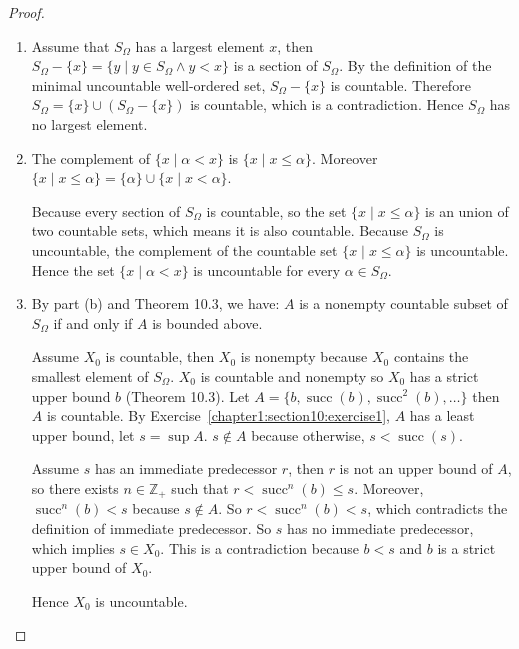 \begin{proof}
    \begin{enumerate}[label={(\alph*)}]
        \item Assume that $S_{\Omega}$ has a largest element $x$, then $S_{\Omega} - \{ x \} = \{ y \mid y\in S_{\Omega} \land y < x \}$ is a section of $S_{\Omega}$. By the definition of the minimal uncountable well-ordered set, $S_{\Omega} - \{ x \}$ is countable. Therefore $S_{\Omega} = \{ x \} \cup (S_{\Omega} - \{ x \})$ is countable, which is a contradiction. Hence $S_{\Omega}$ has no largest element.
        \item The complement of $\{ x \mid \alpha < x \}$ is $\{ x \mid x\leq \alpha \}$. Moreover $\{ x \mid x\leq \alpha \} = \{ \alpha \} \cup \{ x \mid x < \alpha \}$.

              Because every section of $S_{\Omega}$ is countable, so the set $\{ x \mid x\leq \alpha \}$ is an union of two countable sets, which means it is also countable. Because $S_{\Omega}$ is uncountable, the complement of the countable set $\{ x \mid x\leq \alpha \}$ is uncountable. Hence the set $\{ x \mid \alpha < x \}$ is uncountable for every $\alpha\in S_{\Omega}$.
        \item By part (b) and Theorem 10.3, we have: $A$ is a nonempty countable subset of $S_{\Omega}$ if and only if $A$ is bounded above.

              Assume $X_{0}$ is countable, then $X_{0}$ is nonempty because $X_{0}$ contains the smallest element of $S_{\Omega}$. $X_{0}$ is countable and nonempty so $X_{0}$ has a strict upper bound $b$ (Theorem 10.3). Let $A = \{ b, \operatorname{succ}(b), \operatorname{succ}^{2}(b), \ldots \}$ then $A$ is countable. By Exercise~\ref{chapter1:section10:exercise1}, $A$ has a least upper bound, let $s = \sup A$. $s\notin A$ because otherwise, $s < \operatorname{succ}(s)$.

              Assume $s$ has an immediate predecessor $r$, then $r$ is not an upper bound of $A$, so there exists $n\in\mathbb{Z}_{+}$ such that $r < \operatorname{succ}^{n}(b)\leq s$. Moreover, $\operatorname{succ}^{n}(b) < s$ because $s\notin A$. So $r < \operatorname{succ}^{n}(b) < s$, which contradicts the definition of immediate predecessor. So $s$ has no immediate predecessor, which implies $s\in X_{0}$. This is a contradiction because $b < s$ and $b$ is a strict upper bound of $X_{0}$.

              Hence $X_{0}$ is uncountable.
    \end{enumerate}
\end{proof}

